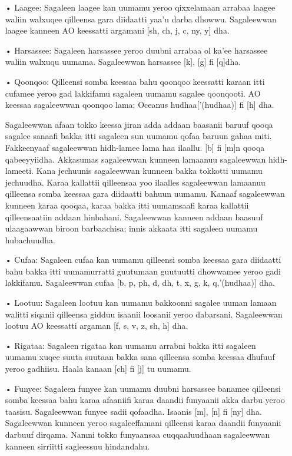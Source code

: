 \documentclass[11pt,b5paper]{book}
\begin{document}
\begin{itemize}
\item[•] Laagee: Sagaleen laagee kan uumamu yeroo qixxelamaan arrabaa laagee waliin walxuqee qilleensa gara diidaatti yaa’u darba dhowwu.  Sagaleewwan laagee kanneen AO keessatti argamani [sh, ch, j, c, ny, y] dha.  

\item[•] Harsassee: Sagaleen harsassee yeroo duubni arrabaa ol ka’ee harsassee waliin walxuqu uumama.  Sagaleewwan harsassee [k], [g] fi [q]dha.

\item[•] Qoonqoo: Qilleensi somba keessaa bahu qoonqoo keessatti karaan itti cufamee yeroo gad lakkifamu sagaleen uumamu sagalee qoonqooti. 
AO keessaa sagaleewwan qoonqoo lama; Oceanus hudhaa['(hudhaa)] fi [h] dha.

Sagaleewwan afaan tokko keessa jiran adda addaan baasanii baruuf qooqa sagalee sanaafi bakka itti sagaleen sun uumamu qofaa baruun gahaa miti.  Fakkeenyaaf sagaleewwan hidh-lamee lama haa ilaallu.  [b] fi [m]n qooqa qabeeyyiidha.  Akkasumas sagaleewwan kunneen lamaanuu sagaleewwan hidh-lameeti.  Kana jechuunis sagaleewwan kunneen bakka tokkotti uumamu jechuudha.  Karaa kallattii qilleensaa yoo ilaalles sagaleewwan lamaanuu qilleensa somba keessaa gara diidaatti bahuun uumamu.  Kanaaf sagaleewwan kunneen karaa qooqaa, karaa bakka itti uumamsaafi karaa kallattii qilleensaatiin addaan hinbahani.  Sagaleewwan kanneen addaan baasuuf ulaagaawwan  biroon barbaachisa; innis akkaata itti sagaleen uumamu hubachuudha. 

\item[•] Cufaa: Sagaleen cufaa kan uumamu qilleensi somba keessaa gara diidaatti bahu bakka itti uumamurratti guutumaan guutuutti dhowwamee yeroo gadi lakkifamu.  Sagaleewwan cufaa [b, p, ph, d, dh, t, x, g, k, q,’(hudhaa)] dha. 

\item[•] Lootuu: Sagaleen lootuu kan uumamu bakkoonni sagalee uuman lamaan walitti siqanii qilleensa gidduu isaanii loosanii yeroo dabarsani.  Sagaleewwan lootuu AO keessatti argaman [f, s, v, z, sh, h] dha.

\item[•] Rigataa: Sagaleen rigataa kan uumamu arrabni bakka itti sagaleen uumamu xuqee suuta suutaan bakka sana qilleensa somba keessaa dhufuuf yeroo gadhiisu.  Haala kanaan [ch] fi [j] tu uumamu. 

\item[•] Funyee: Sagaleen funyee kan uumamu duubni harsassee banamee qilleensi somba keessaa bahu karaa afaaniifi karaa daandii funyaanii akka darbu yeroo taasisu.  Sagaleewwan funyee sadii qofaadha.  Isaanis [m], [n] fi [ny] dha.  Sagaleewwan kunneen yeroo sagaleeffamani qilleensi karaa daandii funyaanii darbuuf dirqama.  Namni tokko funyaansaa cuqqaaluudhaan sagaleewwan kanneen sirriitti sagleessuu hindandahu. 


\end{itemize}
\end{document}
